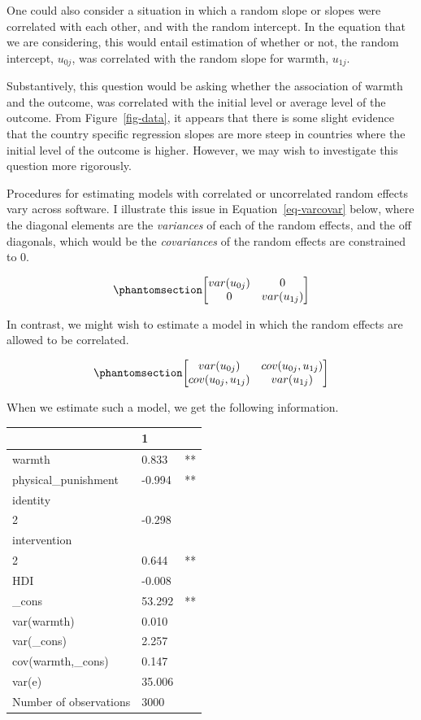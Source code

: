 \documentclass[
  letterpaper,
  DIV=11,
  numbers=noendperiod]{scrreprt}
\begin{document}
One could also consider a situation in which a random slope or slopes
were correlated with each other, and with the random intercept. In the
equation that we are considering, this would entail estimation of
whether or not, the random intercept, \(u_{0j}\), was correlated with
the random slope for warmth, \(u_{1j}\).

Substantively, this question would be asking whether the association of
warmth and the outcome, was correlated with the initial level or average
level of the outcome. From Figure~\ref{fig-data}, it appears that there
is some slight evidence that the country specific regression slopes are
more steep in countries where the initial level of the outcome is
higher. However, we may wish to investigate this question more
rigorously.

Procedures for estimating models with correlated or uncorrelated random
effects vary across software. I illustrate this issue in
Equation~\ref{eq-varcovar} below, where the diagonal elements are the
\emph{variances} of each of the random effects, and the off diagonals,
which would be the \emph{covariances} of the random effects are
constrained to 0.

\begin{equation}\phantomsection\label{eq-varcovar}{\begin{bmatrix}
var(u_{0j}) & 0 \\
0 & var(u_{1j}) 
\end{bmatrix}}\end{equation}

In contrast, we might wish to estimate a model in which the random
effects are allowed to be correlated.

\begin{equation}\phantomsection\label{eq-varcovaruns}{\begin{bmatrix}
var(u_{0j}) & cov(u_{0j}, u_{1j}) \\
cov(u_{0j}, u_{1j}) & var(u_{1j}) 
\end{bmatrix}}\end{equation}

When we estimate such a model, we get the following information.

\begin{longtable}[]{@{}lll@{}}
\toprule\noalign{}
& 1 & \\
\midrule\noalign{}
\endhead
\bottomrule\noalign{}
\endlastfoot
warmth & 0.833 & ** \\
physical\_punishment & -0.994 & ** \\
identity & & \\
2 & -0.298 & \\
intervention & & \\
2 & 0.644 & ** \\
HDI & -0.008 & \\
\_cons & 53.292 & ** \\
var(warmth) & 0.010 & \\
var(\_cons) & 2.257 & \\
cov(warmth,\_cons) & 0.147 & \\
var(e) & 35.006 & \\
Number of observations & 3000 & \\
\end{longtable}
\end{document}
